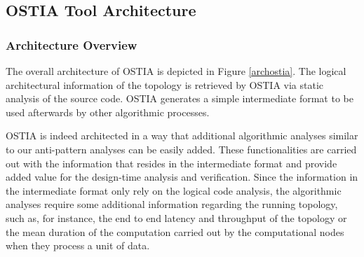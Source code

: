 \documentclass[smallextended]{svjour3}       %
\begin{document}


\subsection{OSTIA Tool Architecture}

\subsubsection{Architecture Overview}

The overall architecture of OSTIA is depicted in
Figure \ref{archostia}. The logical architectural information of the
topology is retrieved by OSTIA via static analysis of the source code. OSTIA
generates a simple intermediate format to be used afterwards by other algorithmic
processes.

OSTIA is indeed architected in a way that additional algorithmic analyses similar to our anti-pattern
analyses can be easily added. These functionalities are carried out with the information that resides in the
intermediate format and provide added value for the design-time analysis and verification. Since the information in the intermediate format only rely
on the logical code analysis, the algorithmic analyses require some additional
information regarding the running topology, such as, for instance, the end to end latency and
throughput of the topology or the mean duration of the computation carried out by the computational nodes when they process a unit of data.
\end{document}
